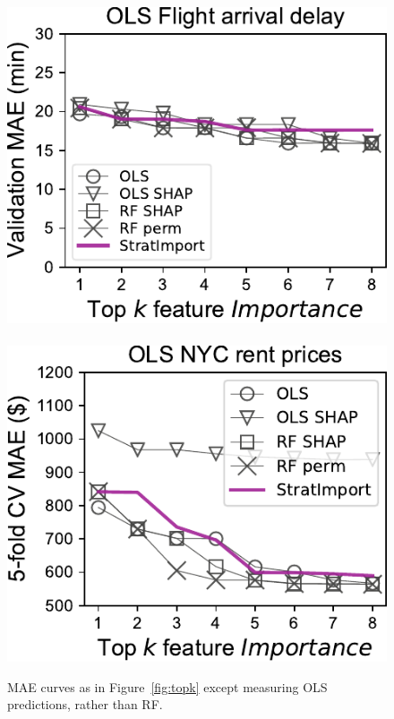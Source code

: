 \documentclass[11pt]{article}
\newcommand{\figref}[1]{Figure~\ref{#1}}
\begin{document}
\begin{figure}[htbp]
\begin{center}
\includegraphics[scale=0.5]{images/flights-topk-OLS-Importance.pdf}~~~\includegraphics[scale=0.5]{images/rent-topk-OLS-Importance.pdf}
\caption[short]{\small MAE curves as in \figref{fig:topk} except measuring OLS predictions, rather than RF.}
\label{fig:OLS}
\end{center}
\end{figure}
\end{document}
